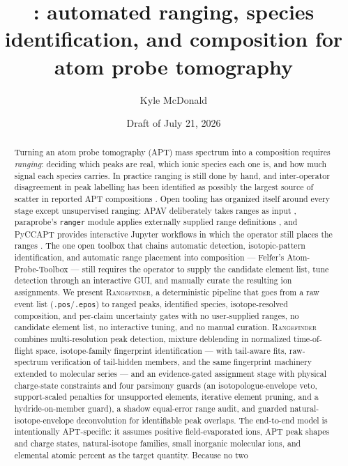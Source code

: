 \documentclass[11pt]{article}
\title{\rf{}: automated ranging, species identification, and composition
for atom probe tomography}
\author{Kyle McDonald}
\date{Draft of July 21, 2026}
\newcommand{\rf}{\textsc{Rangefinder}}
\begin{document}
\maketitle

\begin{abstract}
Turning an atom probe tomography (APT) mass spectrum into a composition
requires \emph{ranging}: deciding which peaks are real, which ionic species
each one is, and how much signal each species carries. In practice ranging
is still done by hand, and inter-operator disagreement in peak labelling has
been identified as possibly the largest source of scatter in reported APT
compositions \citep{haley2015guided,hudson2011}. Open tooling has organized
itself around every stage except unsupervised ranging: APAV deliberately
takes ranges as input \citep{smith2023apav}, paraprobe's \texttt{ranger}
module applies externally supplied range definitions \citep{kuhbach2021},
and PyCCAPT provides interactive Jupyter workflows in which the operator
still places the ranges \citep{monajem2025pyccapt}. The one open toolbox
that chains automatic detection, isotopic-pattern identification, and
automatic range placement into composition --- Felfer's Atom-Probe-Toolbox
\citep{heller2024matlab,felfer_toolbox} --- still requires the operator to
supply the candidate element list, tune detection through an interactive
GUI, and manually curate the resulting ion assignments. We present \rf{}, a
deterministic pipeline that goes from a raw event list
(\texttt{.pos}/\texttt{.epos}) to ranged peaks, identified species,
isotope-resolved composition, and per-claim uncertainty gates with no
user-supplied ranges, no candidate element list, no interactive tuning, and
no manual curation. \rf{} combines
multi-resolution peak detection, mixture deblending in normalized
time-of-flight space, isotope-family fingerprint identification --- with
tail-aware fits, raw-spectrum verification of tail-hidden members, and
the same fingerprint machinery extended to molecular series --- and an
evidence-gated assignment stage with physical charge-state constraints
and four parsimony guards (an isotopologue-envelope veto, support-scaled
penalties for unsupported elements, iterative element pruning, and a
hydride-on-member guard), a shadow equal-error range audit, and guarded
natural-isotope-envelope deconvolution for identifiable peak overlaps. The end-to-end model is intentionally
APT-specific: it assumes positive field-evaporated ions, APT peak shapes
and charge states, natural-isotope families, small inorganic molecular
ions, and elemental atomic percent as the target quantity. Because no two

\end{abstract}
\end{document}
